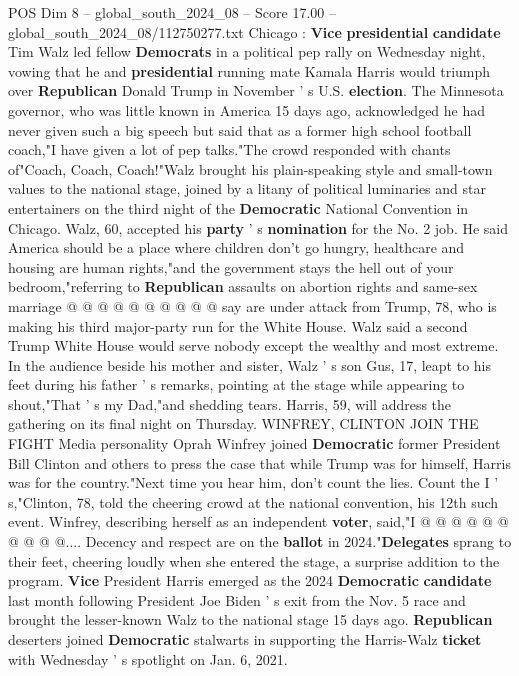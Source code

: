 \begin{textsample}{POS Dim 8 – global\_south\_2024\_08 – Score 17.00 – global\_south\_2024\_08/112750277.txt}  \label{ex:f8_pos_169}
Chicago : \textbf{Vice} \textbf{presidential} \textbf{candidate} Tim Walz led fellow \textbf{Democrats} in a political pep rally on Wednesday night, vowing that he and \textbf{presidential} running mate Kamala Harris would triumph over \textbf{Republican} Donald Trump in November ' s U.S. \textbf{election}.
The Minnesota governor, who was little known in America 15 days ago, acknowledged he had never given such a big speech but said that as a former high school football coach,"I have given a lot of pep talks."The crowd responded with chants of"Coach, Coach, Coach!"Walz brought his plain-speaking style and small-town values to the national stage, joined by a litany of political luminaries and star entertainers on the third night of the \textbf{Democratic} National Convention in Chicago.
Walz, 60, accepted his \textbf{party} ' s \textbf{nomination} for the No. 2 job.
He said America should be a place where children don't go hungry, healthcare and housing are human rights,"and the government stays the hell out of your bedroom,"referring to \textbf{Republican} assaults on abortion rights and same-sex marriage @ @ @ @ @ @ @ @ @ @ say are under attack from Trump, 78, who is making his third major-party run for the White House.
Walz said a second Trump White House would serve nobody except the wealthy and most extreme.
In the audience beside his mother and sister, Walz ' s son Gus, 17, leapt to his feet during his father ' s remarks, pointing at the stage while appearing to shout,"That ' s my Dad,"and shedding tears.
Harris, 59, will address the gathering on its final night on Thursday.
WINFREY, CLINTON JOIN THE FIGHT Media personality Oprah Winfrey joined \textbf{Democratic} former President Bill Clinton and others to press the case that while Trump was for himself, Harris was for the country."Next time you hear him, don't count the lies.
Count the I ' s,"Clinton, 78, told the cheering crowd at the national convention, his 12th such event.
Winfrey, describing herself as an independent \textbf{voter}, said,"I @ @ @ @ @ @ @ @ @ @....
Decency and respect are on the \textbf{ballot} in 2024."\textbf{Delegates} sprang to their feet, cheering loudly when she entered the stage, a surprise addition to the program. \textbf{Vice} President Harris emerged as the 2024 \textbf{Democratic} \textbf{candidate} last month following President Joe Biden ' s exit from the Nov. 5 race and brought the lesser-known Walz to the national stage 15 days ago. \textbf{Republican} deserters joined \textbf{Democratic} stalwarts in supporting the Harris-Walz \textbf{ticket} with Wednesday ' s spotlight on Jan. 6, 2021.

\end{textsample}
